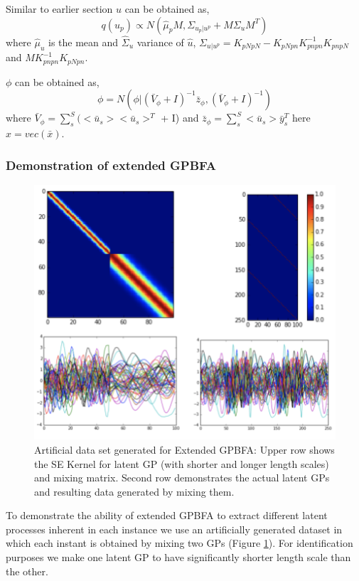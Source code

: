 {Similar to earlier section $u$ can be obtained as, 
$${
q(u_p) \propto N (\hat{\mu}_p M, \Sigma_{u_p|u^{p}} + M\Sigma_{u}M^{T})
}$$
where  $\hat{\mu}_{u}$ is the mean and ${\hat{\Sigma}_{u}}$ variance of $\hat{u}$, $\Sigma_{u|u^{p}} = K_{pNpN} - K_{pNpn}K_{pnpn}^{-1}K_{pnpN}$ and $M K_{pnpn}^{-1}K_{pNpn}$.

$\phi$ can be obtained as, 
$${\phi = N(\phi| (\bar{V}_{\phi} + I)^{-1}\bar{z}_{\phi}, (\bar{V}_{\phi} + I)^{-1})}$$
where $\bar{V}_{\phi} = \sum_{s}^{S}(<\bar{u}_s><\bar{u}_s>^T$ + I)
and $\bar{z}_{\phi} = \sum_{s}^{S}<\bar{u}_s>\bar{y}_{s}^T$
here $x = vec(\bar{x})$.

\subsubsection{ Demonstration of extended GPBFA}
\begin{figure}
    \centering
    \includegraphics[scale=0.45]{thesis/images/eslfm_data.png}
    \caption{Artificial data set generated for Extended GPBFA: Upper row shows the SE Kernel for latent GP (with shorter and longer length scales) and mixing matrix. Second row demonstrates the actual latent GPs and resulting data generated by mixing them. }
    \label{fig:eslfm_data}
\end{figure}
To demonstrate the ability of extended GPBFA to extract different latent processes inherent in each instance we use an artificially generated dataset in which each instant is obtained by mixing two GPs (Figure \ref{fig:eslfm_data}). For identification purposes  we make one latent GP to have significantly shorter length scale than the other.
\begin{figure}

\end{figure}}
